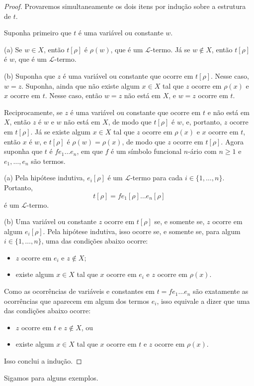 \begin{proof}
    Provaremos simultaneamente os dois itens por indução sobre a estrutura de $t$.

    Suponha primeiro que $t$ é uma variável ou constante $w$.

    (a) Se $w\in X$, então $t[\rho]$ é $\rho(w)$, que é um $\mathcal L$-termo.
    Já se $w\notin X$, então $t[\rho]$ é $w$, que é um $\mathcal L$-termo.

    (b) Suponha que $z$ é uma variável ou constante que ocorre em $t[\rho]$.
    Nesse caso, $w=z$.
    Suponha, ainda que não existe algum $x\in X$ tal que $z$ ocorre em $\rho(x)$ e $x$ ocorre em $t$.
    Nesse caso, então $w=z$ não está em $X$, e $w=z$ ocorre em $t$.

    Reciprocamente, se $z$ é uma variável ou constante que ocorre em $t$ e não está em $X$, então $z$ é $w$ e $w$ não está em $X$, de modo que $t[\rho]$ é $w$, e, portanto, $z$ ocorre em $t[\rho]$.
    Já se existe algum $x\in X$ tal que $z$ ocorre em $\rho(x)$ e $x$ ocorre em $t$, então $x$ é $w$, e $t[\rho]$ é $\rho(w)=\rho(x)$, de modo que $z$ ocorre em $t[\rho]$.
    \smallskip
    Agora suponha que $t$ é $fe_1\dots e_n$, em que $f$ é um símbolo funcional $n$-ário com $n\geq 1$ e $e_1,\dots,e_n$ são termos.

    (a) Pela hipótese indutiva, $e_i[\rho]$ é um $\mathcal L$-termo para cada $i\in\{1,\dots,n\}$.
    Portanto,
    \[
        t[\rho]=fe_1[\rho]\dots e_n[\rho]
    \]
    é um $\mathcal L$-termo.

    (b) Uma variável ou constante $z$ ocorre em $t[\rho]$ se, e somente se, $z$ ocorre em algum $e_i[\rho]$.
    Pela hipótese indutiva, isso ocorre se, e somente se, para algum $i\in\{1,\dots,n\}$, uma das condições abaixo ocorre:
    \begin{itemize}
        \item $z$ ocorre em $e_i$ e $z\notin X$;
        \item existe algum $x\in X$ tal que $x$ ocorre em $e_i$ e $z$ ocorre em $\rho(x)$.
    \end{itemize}

    Como as ocorrências de variáveis e constantes em $t=fe_1\dots e_n$ são exatamente as ocorrências que aparecem em algum dos termos $e_i$, isso equivale a dizer que uma das condições abaixo ocorre:
    \begin{itemize}
        \item $z$ ocorre em $t$ e $z\notin X$, ou
        \item existe algum $x\in X$ tal que $x$ ocorre em $t$ e $z$ ocorre em $\rho(x)$.
    \end{itemize}

    Isso conclui a indução.
\end{proof}
Sigamos para alguns exemplos.

